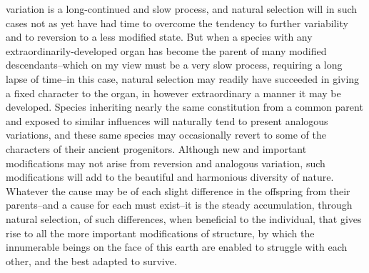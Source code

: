 variation is a long-continued and slow process, and natural selection will in such cases not as yet have had time to overcome the tendency to further variability and to reversion to a less modified state. But when a species with any extraordinarily-developed organ has become the parent of many modified descendants--which on my view must be a very slow process, requiring a long lapse of time--in this case, natural selection may readily have succeeded in giving a fixed character to the organ, in however extraordinary a manner it may be developed. Species inheriting nearly the same constitution from a common parent and exposed to similar influences will naturally tend to present analogous variations, and these same species may occasionally revert to some of the characters of their ancient progenitors. Although new and important modifications may not arise from reversion and analogous variation, such modifications will add to the beautiful and harmonious diversity of nature.
Whatever the cause may be of each slight difference in the offspring from their parents--and a cause for each must exist--it is the steady accumulation, through natural selection, of such differences, when beneficial to the individual, that gives rise to all the more important modifications of structure, by which the innumerable beings on the face of this earth are enabled to struggle with each other, and the best adapted to survive. 